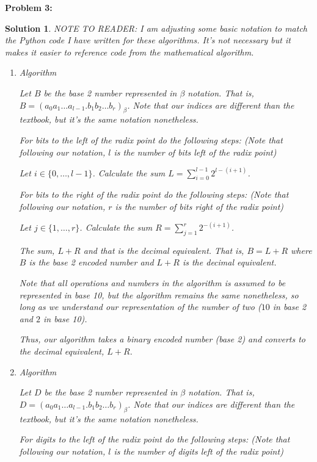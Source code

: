 \documentclass[12pt, letterpaper]{article}
\theoremstyle{nonumberplain}
\newtheorem{sol}{Solution}
\begin{document}
\hspace{18pt}\textbf{Problem 3:} \medskip
\begin{sol}
    NOTE TO READER: I am adjusting some basic notation to match the Python code I have written for these algorithms. It's not necessary but it makes it easier to reference code from the mathematical algorithm.
    \begin{enumerate}[label=\alph*)]
        \item Algorithm

            Let $B$ be the base 2 number represented in $\beta$ notation. That is, $B = (a_0 a_1 \ldots a_{l-1}.b_1 b_2 \ldots b_r)_\beta$. Note that our indices are different than the textbook, but it's the same notation nonetheless.

            For bits to the left of the radix point do the following steps: (Note that following our notation, $l$ is the number of bits left of the radix point)

            Let $i\in \{0, \ldots, l-1\}$. Calculate the sum $L = \sum_{i=0}^{l-1}2^{l - (i+1)}$.

            For bits to the right of the radix point do the following steps: (Note that following our notation, $r$ is the number of bits right of the radix point)

            Let $j\in \{1, \ldots, r\}$. Calculate the sum $R = \sum_{j=1}^r 2^{-(i+1)}$.

            The sum, $L+R$ and that is the decimal equivalent. That is, $B = L+R$ where $B$ is the base 2 encoded number and $L+R$ is the decimal equivalent. 

            Note that all operations and numbers in the algorithm is assumed to be represented in base 10, but the algorithm remains the same nonetheless, so long as we understand our representation of the number of two ($10$ in base 2 and $2$ in base 10).

            Thus, our algorithm takes a binary encoded number (base 2) and converts to the decimal equivalent, $L+R$.


        \item Algorithm

            Let $D$ be the base 2 number represented in $\beta$ notation. That is, $D = (a_0 a_1 \ldots a_{l-1}.b_1 b_2 \ldots b_r)_\beta$. Note that our indices are different than the textbook, but it's the same notation nonetheless.

            For digits to the left of the radix point do the following steps: (Note that following our notation, $l$ is the number of digits left of the radix point)


\end{enumerate}
\end{sol}
\end{document}
